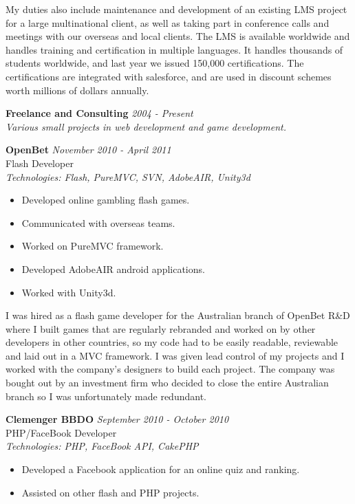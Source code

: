 \documentclass[a4paper,10pt]{article}
\begin{document}
My duties also include maintenance and development of an existing LMS project for a large multinational client, as well as taking part in conference calls and meetings with our overseas and local clients. The LMS is available worldwide and handles training and certification in multiple languages. It handles thousands of students worldwide, and last year we issued 150,000 certifications. The certifications are integrated with salesforce, and are used in discount schemes worth millions of dollars annually.

\vspace{1em}

\textbf{Freelance and Consulting} \hfill \textit{2004 - Present} \\
\textit{Various small projects in web development and game development.}

\vspace{1em}

\textbf{OpenBet} \hfill \textit{November 2010 - April 2011} \\
Flash Developer \\
\textit{Technologies: Flash, PureMVC, SVN, AdobeAIR, Unity3d}
\begin{itemize}
    \item Developed online gambling flash games.
    \item Communicated with overseas teams.
    \item Worked on PureMVC framework.
    \item Developed AdobeAIR android applications.
    \item Worked with Unity3d.
\end{itemize}

I was hired as a flash game developer for the Australian branch of OpenBet R\&D where I built games that are regularly rebranded and worked on by other developers in other countries, so my code had to be easily readable, reviewable and laid out in a MVC framework. I was given lead control of my projects and I worked with the company's designers to build each project. The company was bought out by an investment firm who decided to close the entire Australian branch so I was unfortunately made redundant.

\vspace{1em}

\textbf{Clemenger BBDO} \hfill \textit{September 2010 - October 2010} \\
PHP/FaceBook Developer \\
\textit{Technologies: PHP, FaceBook API, CakePHP}
\begin{itemize}
    \item Developed a Facebook application for an online quiz and ranking.
    \item Assisted on other flash and PHP projects.
\end{itemize}
\end{document}
